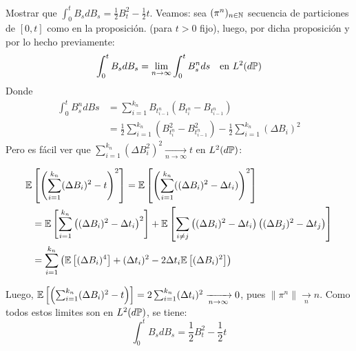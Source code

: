 \begin{example}
        Mostrar que $\int_{0}^{t} B_s dB_s = \frac{1}{2} B_t^2 - \frac{1}{2}t$.
        Veamos: sea $(\pi^{n})_{n \in \N}$ secuencia de particiones de $[0,t]$ como en la proposición. 
        (para $t >0$ fijo), luego, por dicha proposición y por lo hecho previamente:
        \begin{equation*}
                \int_{0}^{t} B_s dB_s = \lim_{n \to \infty} \int_{0}^{t} B_s^n ds ~ ~ ~ \text{en } L^{2}(d\P)
        \end{equation*}
Donde 
\begin{align*}
        \int_{0}^{t} B_s^n dBs 
        &= \sum_{i=1}^{k_n} B_{t_{i-1}^n}(B_{t_{i}^n} - B_{t_{i-1}^n}) \\ 
        &= \frac{1}{2} \sum_{i=1}^{k_n} (B_{t_{i}^n}^2 - B_{t_{i-1}^n}^2) -
        \frac{1}{2} \sum_{i=1}^{k_n} (\Delta B_i)^2
\end{align*}
        Pero es fácil ver que $\sum_{i=1}^{k_n} (\Delta B_i^2)^2 \xrightarrow[n \to \infty]{} t$ en 
        $L^2(d\P)$: 

        \begin{align*}
                \E &\left[ \left( \sum_{i=1}^{k_n} (\Delta B_i)^2 - t \right)^2 \right]
                = \E \left[ \left( \sum_{i=1}^{k_n} ((\Delta B_i)^2 - \Delta t_i)  \right)^2 \right] \\
                &= \E \left[ \sum_{i=1}^{k_n} \left( (\Delta B_i)^2 - \Delta t_i  \right)^2 \right] 
                   + \E \left[ \sum_{i \neq j} \left( (\Delta B_i)^2 - \Delta t_i \right) 
                                               \left( (\Delta B_j)^2 - \Delta t_j \right) 
                                               \right] \\
                &= \sum_{i=1}^{k_n} \left( \E \left[ (\Delta B_i)^4 \right] + (\Delta t_i)^2  
                             -2\Delta t_i \E \left[ (\Delta B_i)^2 \right] \right)
        \end{align*}

        Luego, $\E \left[ \left( \sum_{i=1}^{k_n} (\Delta B_i )^2 - t \right)  \right] = 2 \sum_{i=1}^{k_n}
        (\Delta t_i)^2 \xrightarrow[n \to \infty]{} 0$, pues $\|\pi^n\| \xrightarrow[n]{} n$. Como todos 
        estos limites son en $L^2(d\P)$, se tiene:
        \begin{equation*}
                \label{eq:ej}
                \tag{*}
                \int_{0}^{t} B_s dB_s = \frac{1}{2} B_t^2 - \frac{1}{2}t
        \end{equation*}
\end{example}

